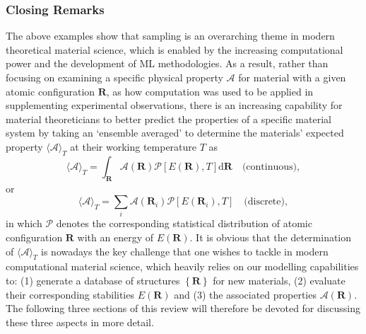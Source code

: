 \subsubsection{Closing Remarks}  
The above examples show that sampling is an overarching theme in modern theoretical material science, which is enabled by the increasing computational power and the development of ML methodologies. As a result, rather than focusing on examining a specific physical property $\mathcal{A}$ for material with a given atomic configuration $\bm{R}$, as how computation was used to be applied in supplementing experimental observations, there is an increasing capability for material theoreticians to better predict the properties of a specific material system by taking an `ensemble averaged' to determine the materials' expected property $\langle \mathcal{A}\rangle_{T}$ at their working temperature $T$ as
\begin{equation}\label{eq:general_sampling_1}
\langle \mathcal{A}\rangle_{T} = \int_{\bm{R}} \mathcal{A}(\bm{R})\mathcal{P}\left[E(\bm{R}),T\right]\mbox{d}\bm{R} \quad \mbox{(continuous)},
\end{equation}
or
\begin{equation}\label{eq:general_sampling_2}
\langle \mathcal{A}\rangle_{T} = 
\sum_i \mathcal{A}(\bm{R}_i)\mathcal{P}\left[E(\bm{R}_i),T\right] \quad \mbox{(discrete)}, 
\end{equation}
in which $\mathcal{P}$ denotes the corresponding statistical distribution of atomic configuration $\bm{R}$ with an energy of $E(\bm{R})$. It is obvious that the determination of $\langle \mathcal{A}\rangle_{T}$  is nowadays the key challenge that one wishes to tackle in modern computational material science, which heavily relies on our modelling capabilities to: (1) generate a database of structures $\left \{\bm{R}\right\}$ for new materials, (2) evaluate their corresponding stabilities $E(\bm{R})$ and (3) the associated properties $\mathcal{A}(\bm{R})$. The following three sections of this review will therefore be devoted for discussing these three aspects in more detail.
